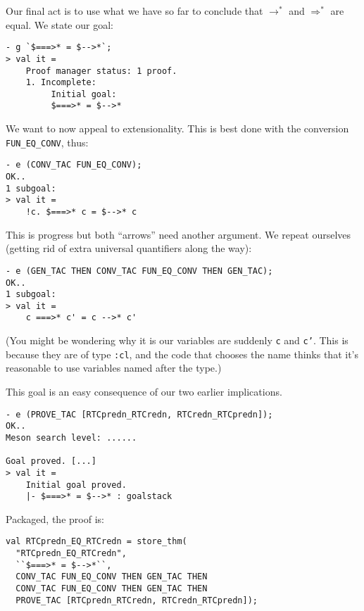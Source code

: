 \documentclass[12pt]{article}
\begin{document}
Our final act is to use what we have so far to conclude that
$\rightarrow^*$ and $\Longrightarrow^*$ are equal.  We state our goal:
\begin{session}\begin{verbatim}
- g `$===>* = $-->*`;
> val it =
    Proof manager status: 1 proof.
    1. Incomplete:
         Initial goal:
         $===>* = $-->*
\end{verbatim}\end{session}
We want to now appeal to extensionality.  This is best done with the
conversion \texttt{FUN\_EQ\_CONV}, thus:
\begin{session}\begin{verbatim}
- e (CONV_TAC FUN_EQ_CONV);
OK..
1 subgoal:
> val it =
    !c. $===>* c = $-->* c
\end{verbatim}\end{session}
This is progress but both ``arrows'' need another argument.  We repeat
ourselves (getting rid of extra universal quantifiers along the way):
\begin{session}\begin{verbatim}
- e (GEN_TAC THEN CONV_TAC FUN_EQ_CONV THEN GEN_TAC);
OK..
1 subgoal:
> val it =
    c ===>* c' = c -->* c'
\end{verbatim}\end{session}
(You might be wondering why it is our variables are suddenly
\texttt{c} and \texttt{c'}.  This is because they are of type
\texttt{:cl}, and the code that chooses the name thinks that it's
reasonable to use variables named after the type.)

This goal is an easy consequence of our two earlier implications.
\begin{session}\begin{verbatim}
- e (PROVE_TAC [RTCpredn_RTCredn, RTCredn_RTCpredn]);
OK..
Meson search level: ......

Goal proved. [...]
> val it =
    Initial goal proved.
    |- $===>* = $-->* : goalstack
\end{verbatim}\end{session}
Packaged, the proof is:
\begin{session}\begin{verbatim}
val RTCpredn_EQ_RTCredn = store_thm(
  "RTCpredn_EQ_RTCredn",
  ``$===>* = $-->*``,
  CONV_TAC FUN_EQ_CONV THEN GEN_TAC THEN
  CONV_TAC FUN_EQ_CONV THEN GEN_TAC THEN
  PROVE_TAC [RTCpredn_RTCredn, RTCredn_RTCpredn]);
\end{verbatim}\end{session}
\end{document}
